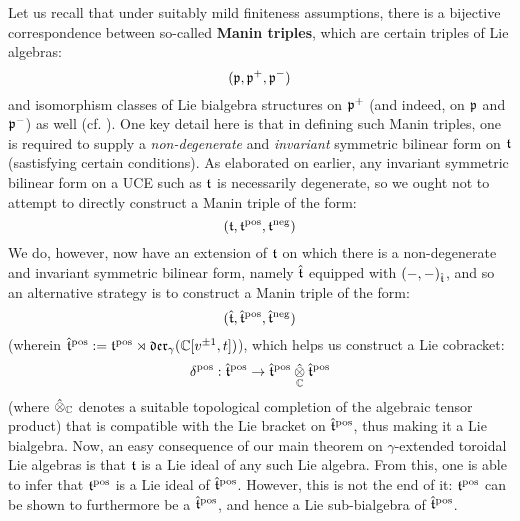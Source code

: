         Let us recall that under suitably mild finiteness assumptions, there is a bijective correspondence between so-called \textbf{Manin triples}, which are certain triples of Lie algebras:
            $$(\mathfrak{p}, \mathfrak{p}^+, \mathfrak{p}^-)$$
        and isomorphism classes of Lie bialgebra structures on $\mathfrak{p}^+$ (and indeed, on $\mathfrak{p}$ and $\mathfrak{p}^-$) as well (cf. \cite{etingof_kazhdan_quantisation_1}). One key detail here is that in defining such Manin triples, one is required to supply a \textit{non-degenerate} and \textit{invariant} symmetric bilinear form on $\mathfrak{t}$ (sastisfying certain conditions). As elaborated on earlier, any invariant symmetric bilinear form on a UCE such as $\mathfrak{t}$ is necessarily degenerate, so we ought not to attempt to directly construct a Manin triple of the form:
            $$(\mathfrak{t}, \mathfrak{t}^{\mathrm{pos}}, \mathfrak{t}^{\mathrm{neg}})$$
        We do, however, now have an extension of $\mathfrak{t}$ on which there is a non-degenerate and invariant symmetric bilinear form, namely $\hat{\mathfrak{t}}$ equipped with $(-, -)_{\hat{\mathfrak{t}}}$, and so an alternative strategy is to construct a Manin triple of the form:
            $$(\hat{\mathfrak{t}}, \hat{\mathfrak{t}}^{\mathrm{pos}}, \hat{\mathfrak{t}}^{\mathrm{neg}})$$
        (wherein $\hat{\mathfrak{t}}^{\mathrm{pos}} := \mathfrak{t}^{\mathrm{pos}} \rtimes \mathfrak{der}_{\gamma}(\mathbb{C}[v^{\pm 1}, t])$), which helps us construct a Lie cobracket:
            $$\delta^{\positive}: \extendedtoroidal^{\positive} \to \extendedtoroidal^{\positive} \hattensor_{\bbC} \extendedtoroidal^{\positive}$$
        (where $\hattensor_{\bbC}$ denotes a suitable topological completion of the algebraic tensor product) that is compatible with the Lie bracket on $\hat{\mathfrak{t}}^{\mathrm{pos}}$, thus making it a Lie bialgebra. Now, an easy consequence of our main theorem on $\gamma$-extended toroidal Lie algebras is that $\mathfrak{t}$ is a Lie ideal of any such Lie algebra. From this, one is able to infer that $\mathfrak{t}^{\mathrm{pos}}$ is a Lie ideal of $\hat{\mathfrak{t}}^{\mathrm{pos}}$. However, this is not the end of it: $\mathfrak{t}^{\mathrm{pos}}$ can be shown to furthermore be a  $\hat{\mathfrak{t}}^{\mathrm{pos}}$, and hence a Lie sub-bialgebra of $\hat{\mathfrak{t}}^{\mathrm{pos}}$.

